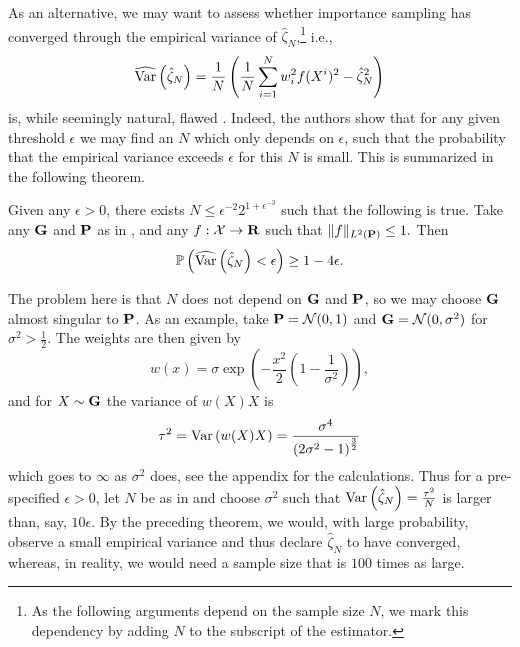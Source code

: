 As an alternative, we may want to assess whether importance sampling has converged through the empirical variance of $\hat \zeta_{N}$,\footnote{As the following arguments depend on the sample size $N$, we mark this dependency by adding $N$ to the subscript of the estimator.} i.e., 
$$
\widehat\var \left( \hat\zeta_{N} \right) = \frac{1}{N}\left(\frac{1}{N} \sum_{i = 1}^N w_{i}^{2} f(X^{i})^{2} - \hat \zeta_{N}^{2}\right)
$$
is, while seemingly natural, flawed \citep{Chatterjee2018Sample}.
Indeed, the authors show that for any given threshold $\epsilon$ we may find an $N$ which only depends on $\epsilon$, such that the probability that the empirical variance exceeds $\epsilon$ for this $N$ is small. This is summarized in the following theorem.

\begin{theorem}
    \label{thm:variance_failure}
    Given any $\epsilon > 0$, there exists  $N \leq \epsilon^{-2} 2^{1 + \epsilon^{-3}}$ such that the following is true. Take any $\G$ and $\P$ as in , and any $f: \mathcal X \to \R$ such that $ \lVert f \rVert_{L^{2}(\P)} \leq 1.$ Then 
    $$
        \mathbb P \left( \widehat \var \left( \hat \zeta_{N} \right) < \epsilon\right) \geq 1 - 4 \epsilon.
    $$
\end{theorem}

The problem here is that $N$ does not depend on $\G$ and $\P$, so we may choose $\G$ almost singular to $\P$. As an example, take $\P = \mathcal N(0, 1)$ and $\G = \mathcal N(0, \sigma^{2})$ for $\sigma^{2} > \frac{1}{2}$. The weights are then given by $$w(x) = \sigma \exp \left( - \frac{x^{2}}{2} \left( 1 - \frac{1}{\sigma^{2}} \right) \right),$$
and for $X \sim \G$ the variance of $w(X)X$ is 
\begin{align}
    \label{eq:variance-wxx}
\tau^{2} = \var \left( w(X)X \right) = \frac{\sigma^{4}}{\left( 2 \sigma^{2} - 1 \right)^{\frac{3}{2}}}
\end{align}
which goes to $\infty$ as $\sigma^2$ does, see the appendix for the calculations. Thus for a pre-specified $\epsilon > 0$, let $N$ be as in  and choose $\sigma^{2}$ such that $\var \left( \hat\zeta_{N} \right) = \frac {\tau^{2}}N$ is larger than, say, $10\epsilon$. By the preceding theorem, we would, with large probability, observe a small empirical variance and thus declare $\hat\zeta_{N}$ to have converged, whereas, in reality, we would need a sample size that is $100$ times as large.

